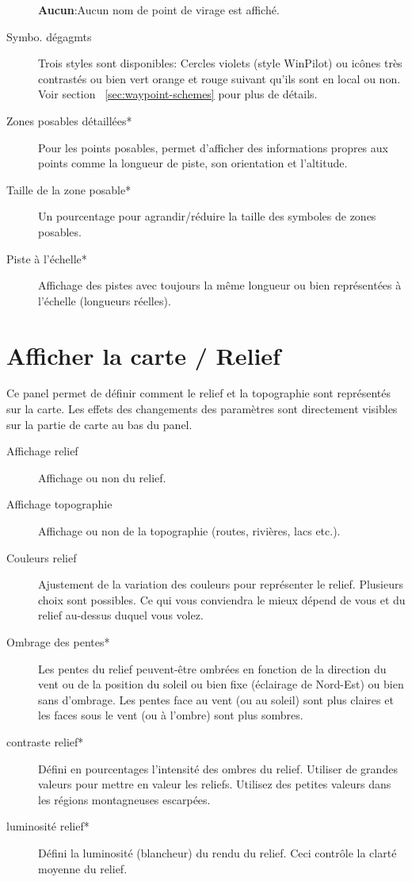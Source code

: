 \begin{description}
  {\bf Aucun}:Aucun nom de point de virage est affiché.
\item[Symbo. dégagmts]  \label{conf:waypointicons} Trois styles sont disponibles:
  Cercles violets (style WinPilot) ou icônes très contrastés ou bien vert orange et rouge suivant qu'ils sont en local ou non. Voir section ~\ref{sec:waypoint-schemes} pour plus de détails.
\item[Zones posables détaillées*]   Pour les points posables, permet d'afficher des informations propres aux points comme la longueur de piste, son orientation et l'altitude.
\item[Taille de la zone posable*]  Un pourcentage  pour agrandir/réduire la taille des symboles de zones posables.
\item[Piste à l'échelle*]  Affichage des pistes avec toujours la même longueur ou bien représentées à l'échelle (longueurs réelles).
\end{description}


\section{Afficher la carte / Relief}\label{sec:terrain-display}

Ce panel permet de définir comment le relief et la topographie sont représentés sur la carte. Les effets  des changements des paramètres sont directement visibles sur la partie de carte au bas du panel.

\begin{description}
\item[Affichage relief]  Affichage ou non du relief.
\item[Affichage topographie]  Affichage ou non de la topographie (routes, rivières, lacs etc.).
\item[Couleurs relief]  Ajustement de la variation des couleurs pour représenter le relief. Plusieurs choix sont possibles. Ce qui vous conviendra le mieux dépend de vous et du relief au-dessus duquel vous volez.
\item[Ombrage des pentes*]  \label{conf:shading} Les pentes du relief peuvent-être ombrées en fonction de la direction du vent ou de la position du soleil ou bien fixe (éclairage de Nord-Est) ou bien sans d'ombrage. Les pentes face au vent (ou au soleil) sont plus claires et les faces sous le vent (ou à l'ombre) sont plus sombres. 
\item[contraste relief*]  Défini en pourcentages l'intensité des ombres du relief. Utiliser de grandes valeurs pour mettre en valeur les reliefs. Utilisez des petites valeurs dans les régions montagneuses escarpées.
\item[luminosité relief*]  Défini la luminosité (blancheur) du rendu du relief. Ceci contrôle la clarté moyenne du relief.
\end{description}

